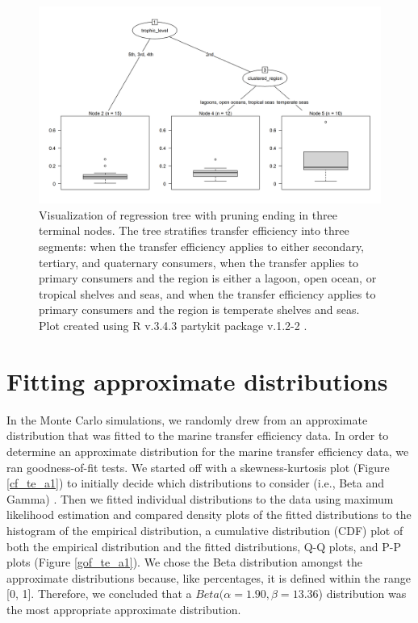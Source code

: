\documentclass[oneside,12pt,final]{sty/ucthesis-CA2012}
\let\cite\citep                             %
\begin{document}
\begin{mainmatter}
\begin{figure}[H]
     \centering
       \includegraphics[width=\textwidth]{fig/tree}
    \caption{Visualization of regression tree with pruning ending in three terminal nodes. The tree stratifies transfer efficiency into three segments: when the transfer efficiency applies to either secondary, tertiary, and quaternary consumers, when the transfer applies to primary consumers and the region is either a lagoon, open ocean, or tropical shelves and seas, and when the transfer efficiency applies to primary consumers and the region is temperate shelves and seas. Plot created using R v.3.4.3 \cite{Rcite} partykit package v.1.2-2 \cite{hothorn2015partykit}.}
    \label{tree}
\end{figure}

\section{Fitting approximate distributions}
In the Monte Carlo simulations, we randomly drew from an approximate distribution that was fitted to the marine transfer efficiency data. In order to determine an approximate distribution for the marine transfer efficiency data, we ran goodness-of-fit tests. We started off with a skewness-kurtosis plot (Figure \ref{cf_te_a1}) to initially decide which distributions to consider (i.e., Beta and Gamma) \cite{fitdistrplus}. Then we fitted individual distributions to the data using maximum likelihood estimation and compared density plots of the fitted distributions to the histogram of the empirical distribution, a cumulative distribution (CDF) plot of both the empirical distribution and the fitted distributions, Q-Q plots, and P-P plots (Figure \ref{gof_te_a1}). We chose the Beta distribution amongst the approximate distributions because, like percentages, it is defined within the range [0, 1]. Therefore, we concluded that a $Beta(\alpha = 1.90, \beta = 13.36$) distribution was the most appropriate approximate distribution. 


\end{mainmatter}
\end{document}

